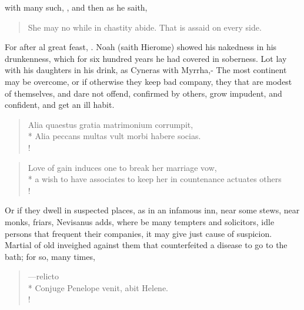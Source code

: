 with many such, \etc{}, and then as he saith,
%
\begin{verse}%
She may no while in chastity abide.
That is assaid on every side.
\end{verse}%

For after al great feast, .
Noah (saith Hierome) showed his nakedness in his drunkenness,
which for six hundred years he had covered in soberness. Lot lay with
his daughters in his drink, as Cyneras with Myrrha,- The most continent may be overcome, or if otherwise
they keep bad company, they that are modest of themselves, and dare not
offend, confirmed by others, grow impudent, and confident, and
get an ill habit.
%
\begin{latin}%
\begin{verse}%
Alia quaestus gratia matrimonium corrumpit,\\*
Alia peccans multas vult morbi habere socias.\\!
\end{verse}%
\end{latin}%
\translationrule%
\begin{verse}%
Love of gain induces one to break her marriage vow,\\*
a wish to have associates to keep her in countenance actuates others\\!
\end{verse}%
%

Or if they dwell in suspected places, as in an infamous inn, near some
stews, near monks, friars, Nevisanus adds, where be many tempters and
solicitors, idle persons that frequent their companies, it may give
just cause of suspicion. Martial of old inveighed against them that
counterfeited a disease to go to the bath; for so, many times,

\begin{latin}%
\begin{verse}%
---relicto\\*
Conjuge Penelope venit, abit Helene.\\!
\end{verse}%
\end{latin}%

